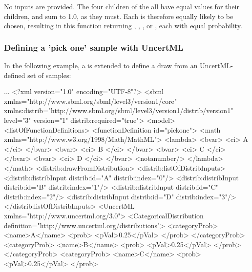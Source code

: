 \documentclass[draftspec]{sbmlpkgspec}
\begin{document}
No inputs are provided.  The four  children of the  all have equal values for their  children, and sum to 1.0, as they must.  Each  is therefore equally likely to be chosen, resulting in this function returning , , , or , each with equal probability.



\subsubsection{Defining a 'pick one' sample with UncertML}
In the following example, a \FunctionDefinition is extended to define a draw from an UncertML-defined set of samples:

\begin{example}
...
<?xml version="1.0" encoding="UTF-8"?>
<sbml xmlns="http://www.sbml.org/sbml/level3/version1/core"
      xmlns:distrib="http://www.sbml.org/sbml/level3/version1/distrib/version1"
      level="3" version="1" distrib:required="true">
  <model>
    <listOfFunctionDefinitions>
      <functionDefinition id="pickone">
        <math xmlns="http://www.w3.org/1998/Math/MathML">
          <lambda>
            <bvar>
              <ci> A </ci>
            </bvar>
            <bvar>
              <ci> B </ci>
            </bvar>
            <bvar>
              <ci> C </ci>
            </bvar>
            <bvar>
              <ci> D </ci>
            </bvar>
            <notanumber/>
          </lambda>
        </math>
        <distrib:drawFromDistribution>
          <distrib:listOfDistribInputs>
            <distrib:distribInput distrib:id="A" distrib:index="0"/>
            <distrib:distribInput distrib:id="B" distrib:index="1"/>
            <distrib:distribInput distrib:id="C" distrib:index="2"/>
            <distrib:distribInput distrib:id="D" distrib:index="3"/>
          </distrib:listOfDistribInputs>
          <UncertML xmlns="http://www.uncertml.org/3.0">
            <CategoricalDistribution definition="http://www.uncertml.org/distributions">
              <categoryProb>
                <name>A</name>
                <prob>
                  <pVal>0.25</pVal>
                </prob>
              </categoryProb>
              <categoryProb>
                <name>B</name>
                <prob>
                  <pVal>0.25</pVal>
                </prob>
              </categoryProb>
              <categoryProb>
                <name>C</name>
                <prob>
                  <pVal>0.25</pVal>
                </prob>

\end{example}
\end{document}
